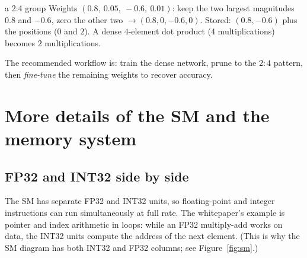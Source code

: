 \begin{workedex}{a 2:4 group}
Weights $(0.8,\ 0.05,\ -0.6,\ 0.01)$: keep the two largest magnitudes $0.8$ and $-0.6$, zero the other two $\to(0.8,0,-0.6,0)$. Stored: $(0.8,-0.6)$ plus the positions ($0$ and $2$). A dense $4$-element dot product (4 multiplications) becomes $2$ multiplications.
\end{workedex}
The recommended workflow is: train the dense network, prune to the $2:4$ pattern, then \emph{fine-tune} the remaining weights to recover accuracy.

\section{More details of the SM and the memory system}
\oos

\subsection{FP32 and INT32 side by side}
The SM has separate FP32 and INT32 units, so floating-point and integer instructions can run simultaneously at full rate. The whitepaper's example is pointer and index arithmetic in loops: while an
FP32 multiply-add works on data, the INT32 units compute the address of the next element.
(This is why the SM diagram has both INT32 and FP32 columns; see Figure~\ref{fig:sm}.)

